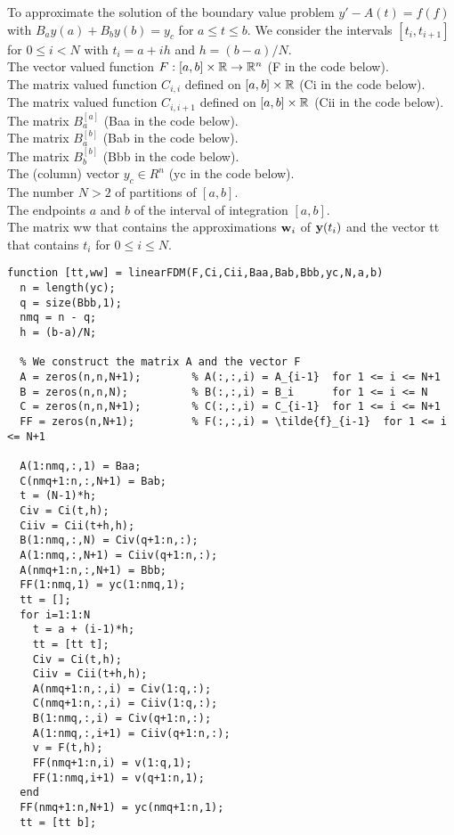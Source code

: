 \begin{code}
To approximate the solution of the boundary value problem
$y' - A(t) = f(f)$ with $B_a y(a) + B_b y(b) = y_c$  for $a \leq t \leq b$.
We consider the intervals $[t_i,t_{i+1}]$ for $0 \leq i < N$ with
$t_i = a + i h$ and $h = (b-a)/N$.\\
 The vector valued function $F:[a,b] \times \mathbb{R} \to \mathbb{R}^n$
(F in the code below).\\
The \nn matrix valued function $C_{i,i}$ defined on $[a,b] \times \mathbb{R}$
(Ci in the code below).\\
The \nn matrix valued function $C_{i,i+1}$ defined on $[a,b] \times
\mathbb{R}$ (Cii in the code below).\\
The  matrix $B_a^{[a]}$ (Baa in the code below).\\
The  matrix $B_a^{[b]}$ (Bab in the code below).\\
The  matrix $B_b^{[b]}$ (Bbb in the code below).\\
The (column) vector $y_c \in R^n$ (yc in the code below).\\
The number $N>2$ of partitions of $[a,b]$.\\
The endpoints $a$ and $b$ of the interval of integration $[a,b]$.\\
 The  matrix ww that contains the approximations
$\mathbf{w}_i$ of $\mathbf{y}(t_i)$ and the vector tt that contains $t_i$
for $0 \leq i \leq N$.
\small
\begin{verbatim}
function [tt,ww] = linearFDM(F,Ci,Cii,Baa,Bab,Bbb,yc,N,a,b)
  n = length(yc);
  q = size(Bbb,1);
  nmq = n - q;
  h = (b-a)/N;
    
  % We construct the matrix A and the vector F
  A = zeros(n,n,N+1);        % A(:,:,i) = A_{i-1}  for 1 <= i <= N+1
  B = zeros(n,n,N);          % B(:,:,i) = B_i      for 1 <= i <= N
  C = zeros(n,n,N+1);        % C(:,:,i) = C_{i-1}  for 1 <= i <= N+1
  FF = zeros(n,N+1);         % F(:,:,i) = \tilde{f}_{i-1}  for 1 <= i <= N+1

  A(1:nmq,:,1) = Baa;
  C(nmq+1:n,:,N+1) = Bab;
  t = (N-1)*h;
  Civ = Ci(t,h);
  Ciiv = Cii(t+h,h);
  B(1:nmq,:,N) = Civ(q+1:n,:);
  A(1:nmq,:,N+1) = Ciiv(q+1:n,:);
  A(nmq+1:n,:,N+1) = Bbb;
  FF(1:nmq,1) = yc(1:nmq,1);
  tt = [];
  for i=1:1:N
    t = a + (i-1)*h;
    tt = [tt t];
    Civ = Ci(t,h);
    Ciiv = Cii(t+h,h);
    A(nmq+1:n,:,i) = Civ(1:q,:);
    C(nmq+1:n,:,i) = Ciiv(1:q,:);
    B(1:nmq,:,i) = Civ(q+1:n,:);
    A(1:nmq,:,i+1) = Ciiv(q+1:n,:);
    v = F(t,h);
    FF(nmq+1:n,i) = v(1:q,1); 
    FF(1:nmq,i+1) = v(q+1:n,1); 
  end
  FF(nmq+1:n,N+1) = yc(nmq+1:n,1);
  tt = [tt b];


\end{verbatim}
\end{code}

